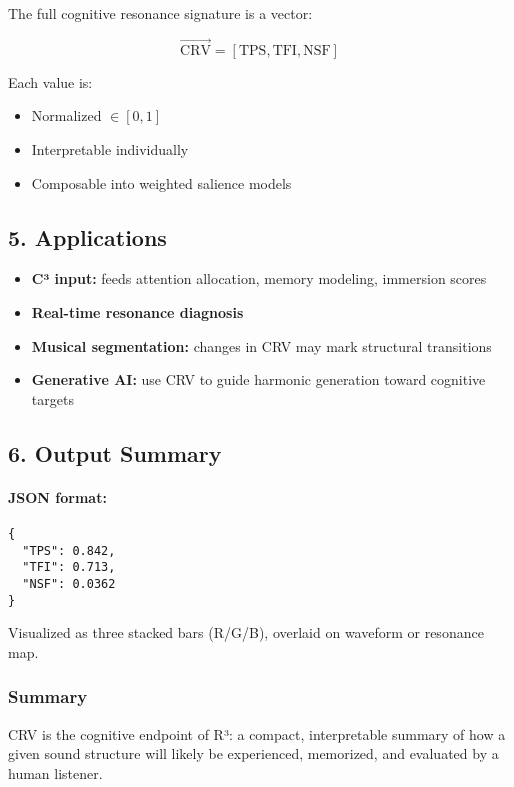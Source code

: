 \documentclass{article}
\begin{document}
The full cognitive resonance signature is a vector:

\[
\vec{\text{CRV}} = [\text{TPS}, \text{TFI}, \text{NSF}]
\]

Each value is:

\begin{itemize}
    \item Normalized $\in [0, 1]$
    \item Interpretable individually
    \item Composable into weighted salience models
\end{itemize}

\subsection*{5. Applications}

\begin{itemize}
    \item \textbf{C³ input:} feeds attention allocation, memory modeling, immersion scores
    \item \textbf{Real-time resonance diagnosis}
    \item \textbf{Musical segmentation:} changes in CRV may mark structural transitions
    \item \textbf{Generative AI:} use CRV to guide harmonic generation toward cognitive targets
\end{itemize}

\subsection*{6. Output Summary}

\paragraph{JSON format:}
\begin{verbatim}
{
  "TPS": 0.842,
  "TFI": 0.713,
  "NSF": 0.0362
}
\end{verbatim}

Visualized as three stacked bars (R/G/B), overlaid on waveform or resonance map.

\subsubsection*{Summary}

CRV is the cognitive endpoint of R³: a compact, interpretable summary of how a given sound structure will likely be experienced, memorized, and evaluated by a human listener.
\end{document}
